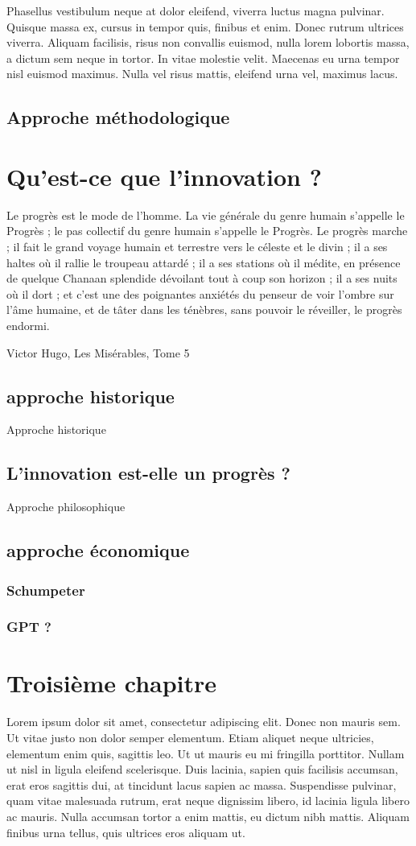 \documentclass[a4paper, 11pt]{report}
\begin{document}
Phasellus vestibulum neque at dolor eleifend, viverra luctus magna pulvinar. Quisque massa ex, cursus in tempor quis, finibus et enim. Donec rutrum ultrices viverra. Aliquam facilisis, risus non convallis euismod, nulla lorem lobortis massa, a dictum sem neque in tortor. In vitae molestie velit. Maecenas eu urna tempor nisl euismod maximus. Nulla vel risus mattis, eleifend urna vel, maximus lacus.

\section{Approche méthodologique}

\chapter{Qu'est-ce que l'innovation ?}
\epigraph{Le progrès est le mode de l’homme. La vie générale du genre humain s’appelle le Progrès ; le pas collectif du genre humain s’appelle le Progrès. Le progrès marche ; il fait le grand voyage humain et terrestre vers le céleste et le divin ; il a ses haltes où il rallie le troupeau attardé ; il a ses stations où il médite, en présence de quelque Chanaan splendide dévoilant tout à coup son horizon ; il a ses nuits où il dort ; et c’est une des poignantes anxiétés du penseur de voir l’ombre sur l’âme humaine, et de tâter dans les ténèbres, sans pouvoir le réveiller, le progrès endormi.}{Victor Hugo, Les Misérables, Tome 5}
\section{approche historique}
Approche historique
\section{L'innovation est-elle un progrès ?}
Approche philosophique
\section{approche économique}
\subsection{Schumpeter}
\subsection{GPT ?}


\chapter{Troisième chapitre}
Lorem ipsum dolor sit amet, consectetur adipiscing elit. Donec non mauris sem. Ut vitae justo non dolor semper elementum. Etiam aliquet neque ultricies, elementum enim quis, sagittis leo. Ut ut mauris eu mi fringilla porttitor. Nullam ut nisl in ligula eleifend scelerisque. Duis lacinia, sapien quis facilisis accumsan, erat eros sagittis dui, at tincidunt lacus sapien ac massa. Suspendisse pulvinar, quam vitae malesuada rutrum, erat neque dignissim libero, id lacinia ligula libero ac mauris. Nulla accumsan tortor a enim mattis, eu dictum nibh mattis. Aliquam finibus urna tellus, quis ultrices eros aliquam ut.
\end{document}
